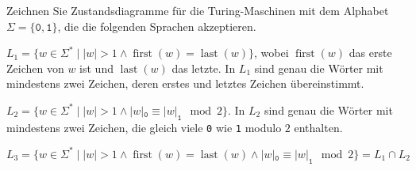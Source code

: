 Zeichnen Sie Zustandsdiagramme für die Turing-Maschinen
mit dem Alphabet $\Sigma=\{\texttt{0},\texttt{1}\}$, die die folgenden
Sprachen akzeptieren.
\begin{teilaufgaben}
\item
\(
L_1
=
\{ w\in\Sigma^*
\;|\;
|w| > 1
\wedge
\operatorname{first}(w) = \operatorname{last}(w)
\}
\),
wobei $\operatorname{first}(w)$ das erste Zeichen von $w$
ist und $\operatorname{last}(w)$ das letzte.
In $L_1$ sind genau die Wörter mit mindestens zwei Zeichen, deren erstes und
letztes Zeichen übereinstimmt.
\item
\(
L_2
=
\{ w\in\Sigma^*
\;|\;
|w| > 1
\wedge
|w|_{\texttt{0}} \equiv |w|_{\texttt{1}} \mod 2
\}
\).
In $L_2$ sind genau die Wörter mit mindestens zwei Zeichen, 
die gleich viele \texttt{0} wie \texttt{1} modulo $2$ enthalten.
\item
\(
L_3
=
\{ w\in\Sigma^*
\;|\;
|w| > 1
\wedge
\operatorname{first}(w) = \operatorname{last}(w)
\wedge
|w|_{\texttt{0}} \equiv |w|_{\texttt{1}} \mod 2
\}
=
L_1\cap L_2
\)
\end{teilaufgaben}


